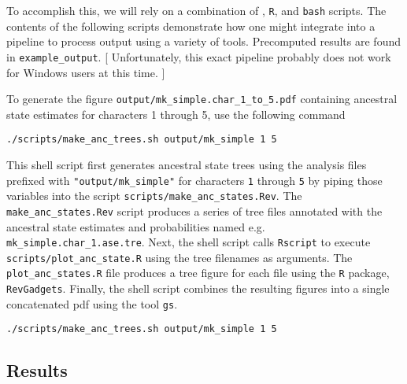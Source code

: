 To accomplish this, we will rely on a combination of \RevBayes, {\tt R}, and {\tt bash} scripts.
The contents of the following scripts demonstrate how one might integrate \RevBayes into a pipeline to process output using a variety of tools.
Precomputed results are found in {\tt example\_output}.
[ Unfortunately, this exact pipeline probably does not work for Windows users at this time. ]

To generate the figure {\tt output/mk\_simple.char\_1\_to\_5.pdf} containing ancestral state estimates for characters 1 through 5, use the following command

{\tt \begin{snugshade*}
\begin{lstlisting}
./scripts/make_anc_trees.sh output/mk_simple 1 5
\end{lstlisting}
\end{snugshade*}}

This shell script first generates ancestral state trees using the analysis files prefixed with {\tt "output/mk\_simple"} for characters {\tt 1} through {\tt 5} by piping those variables into the \RevBayes script {\tt scripts/make\_anc\_states.Rev}.
The {\tt make\_anc\_states.Rev} script produces a series of tree files annotated with the ancestral state estimates and probabilities named e.g. {\tt mk\_simple.char\_1.ase.tre}.
Next, the shell script calls {\tt Rscript} to execute {\tt scripts/plot\_anc\_state.R} using the tree filenames as arguments.
The {\tt plot\_anc\_states.R} file produces a tree figure for each file using the {\tt R} package, {\tt RevGadgets}.
Finally, the shell script combines the resulting figures into a single concatenated pdf using the tool {\tt gs}.



{\tt \begin{snugshade*}
\begin{lstlisting}
./scripts/make_anc_trees.sh output/mk_simple 1 5
\end{lstlisting}
\end{snugshade*}}




\subsection{Results}

\begin{figure}[h!]
\label{fig:mk_simple_ase}
\end{figure}

